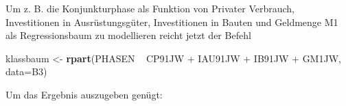 \documentclass[12pt,]{book}
\newenvironment{Shaded}{\begin{snugshade}}{\end{snugshade}}
\newcommand{\KeywordTok}[1]{\textcolor[rgb]{0.13,0.29,0.53}{\textbf{{#1}}}}
\newcommand{\DataTypeTok}[1]{\textcolor[rgb]{0.13,0.29,0.53}{{#1}}}
\newcommand{\StringTok}[1]{\textcolor[rgb]{0.31,0.60,0.02}{{#1}}}
\newcommand{\NormalTok}[1]{{#1}}
\begin{document}
\begin{Shaded}
\end{Shaded}

Um z. B. die Konjunkturphase als Funktion von Privater Verbrauch,
Investitionen in Ausrüstungsgüter, Investitionen in Bauten und Geldmenge
M1 als Regressionsbaum zu modellieren reicht jetzt der Befehl

\begin{Shaded}
\begin{Highlighting}[]
\NormalTok{klassbaum <-}\StringTok{ }\KeywordTok{rpart}\NormalTok{(PHASEN ~}\StringTok{ }\NormalTok{CP91JW +}\StringTok{ }\NormalTok{IAU91JW +}\StringTok{ }\NormalTok{IB91JW +}\StringTok{ }\NormalTok{GM1JW, }\DataTypeTok{data=}\NormalTok{B3)}
\end{Highlighting}
\end{Shaded}

Um das Ergebnis auszugeben genügt:
\end{document}
